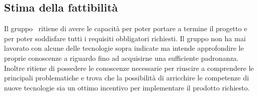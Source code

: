 	\subsection{Stima della fattibilità}
		Il gruppo \groupname\ ritiene di avere le capacità per poter portare a termine il progetto e per poter soddisfare tutti i requisiti obbligatori richiesti. Il gruppo non ha mai lavorato con alcune delle tecnologie sopra indicate ma intende approfondire le proprie conoscenze a riguardo fino ad acquisirne una sufficiente padronanza. Inoltre ritiene di possedere le conoscenze necessarie per riuscire a comprendere le principali problematiche e trova che la possibilità di arricchire le competenze di nuove tecnologie sia un ottimo incentivo per implementare il prodotto richiesto.
	
